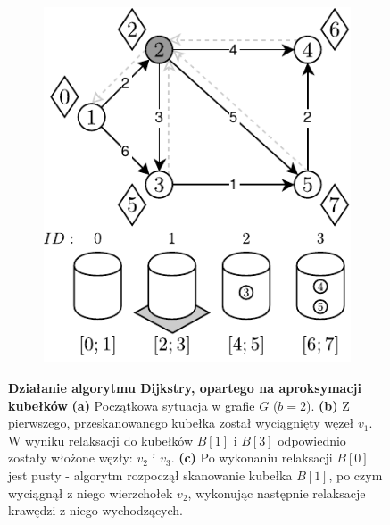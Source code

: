 \begin{figure}[!htbp]
\begin{subfigure}[b]{0.3\textwidth}
		\caption{}
	\end{subfigure}
	\begin{subfigure}[b]{0.3\textwidth}
		\includegraphics[width=\textwidth]{Chapter_II/APROXIMATE-BUCKETS-Example/c.pdf}
		\caption{}
	\end{subfigure}
	\caption{\textbf{Działanie algorytmu Dijkstry, opartego na aproksymacji kubełków} \textbf{(a)} Początkowa sytuacja w grafie $G$ ($b=2$). \textbf{(b)} Z pierwszego, przeskanowanego kubełka został wyciągnięty węzeł $v_{1}$. W wyniku relaksacji do kubełków $B \left[ 1 \right]$ i $B \left[ 3 \right]$ odpowiednio zostały włożone węzły: $v_{2}$ i $v_{3}$.  \textbf{(c)} Po wykonaniu relaksacji $B \left[ 0 \right]$ jest pusty - algorytm rozpoczął skanowanie kubełka $B \left[ 1 \right]$, po czym wyciągnął z niego wierzchołek $v_{2}$, wykonując następnie relaksacje krawędzi z niego wychodzących. } \label{fig:exampleAproximateBuckets1}
\end{figure}

